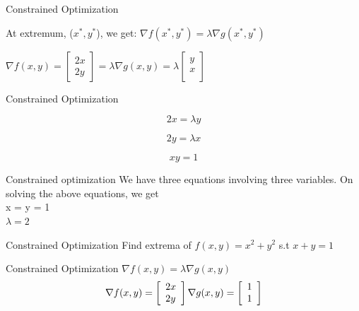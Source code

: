 \documentclass{beamer}
\begin{document}
\begin{frame}{Constrained Optimization}

\begin{tcolorbox}
	At extremum, ($x^*, y^*$), we get: 
$\nabla f(x^*,y^*) = \lambda \nabla g(x^*,y^*)$
\end{tcolorbox}

\pause $\nabla f(x,y) = \begin{bmatrix}
2x\\
2y
\end{bmatrix}
= \lambda \nabla g(x,y)  = \lambda  \begin{bmatrix}
y\\
x\\
\end{bmatrix}$
\end{frame}

\begin{frame}{Constrained Optimization}

\begin{equation}
2x = \lambda y
\end{equation}


\begin{equation}
2y = \lambda x
\end{equation}


\begin{equation}
xy = 1
\end{equation}


\end{frame}

\begin{frame}{Constrained optimization}
We have three equations involving three variables. 
On solving the above equations, we get\\
x = y = 1\\
$\lambda = 2$\\
\end{frame}

\begin{frame}{Constrained Optimization}
Find extrema of $f(x,y) = x^{2} + y^{2}$ s.t $x + y = 1$\\

\end{frame}

\begin{frame}{Constrained Optimization}
$\nabla f(x,y) = \lambda \nabla g(x,y)$ \\
\vspace{1em}
$$
\nabla f(x, y)=\left[\begin{array}{l}
{2 x} \\
{2 y}
\end{array}\right] 
\vspace{1em} 
\nabla g(x, y)=\left[\begin{array}{l}
{1} \\
{1}
\end{array}\right]
$$
\end{frame}
\end{document}
